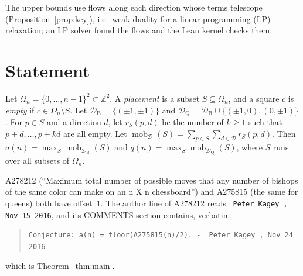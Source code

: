 \documentclass[11pt]{amsart}
\theoremstyle{plain}
\theoremstyle{definition}
\newcommand{\Z}{\mathbb{Z}}
\newcommand{\mob}{\operatorname{mob}}
\newcommand{\DB}{\mathcal{D}_{\mathrm B}}
\newcommand{\DQ}{\mathcal{D}_{\mathrm Q}}
\begin{document}
The upper bounds use flows along each direction whose terms telescope (Proposition~\ref{prop:key}), i.e.\ weak duality for a linear programming (LP) relaxation; an LP solver found the flows and the Lean kernel checks them.

\section{Statement}\label{sec:statement}

Let $\Omega_n=\{0,\dots,n-1\}^2\subset\Z^2$. A \emph{placement} is a subset $S\subseteq\Omega_n$, and a square $c$ is \emph{empty} if $c\in\Omega_n\setminus S$. Let $\DB=\{(\pm1,\pm1)\}$ and $\DQ=\DB\cup\{(\pm1,0),(0,\pm1)\}$. For $p\in S$ and a direction $d$, let $r_S(p,d)$ be the number of $k\ge1$ such that $p+d,\dots,p+kd$ are all empty. Let $\mob_{\mathcal D}(S)=\sum_{p\in S}\sum_{d\in\mathcal D}r_S(p,d)$. Then $a(n)=\max_{S}\mob_{\DB}(S)$ and $q(n)=\max_S\mob_{\DQ}(S)$, where $S$ runs over all subsets of $\Omega_n$.

A278212 \cite{A278212} (``Maximum total number of possible moves that any number of bishops of the same color can make on an n X n chessboard'') and A275815 \cite{A275815} (the same for queens) both have offset~$1$. The author line of A278212 reads \texttt{\_Peter Kagey\_, Nov 15 2016}, and its COMMENTS section contains, verbatim,
\begin{quote}\raggedright
\texttt{Conjecture: a(n) = floor(A275815(n)/2). - \_Peter Kagey\_, Nov 24 2016}
\end{quote}
which is Theorem~\ref{thm:main}.
\end{document}
